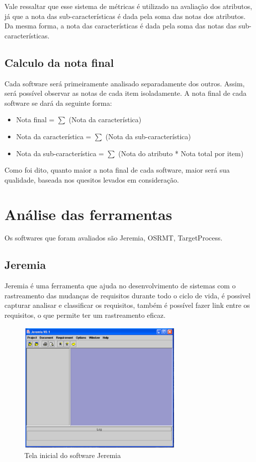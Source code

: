   Vale ressaltar que esse sistema de métricas é utilizado na avaliação dos atributos, já que a nota das sub-características é dada pela
  soma das notas dos atributos. Da mesma forma, a nota das características é dada pela soma das notas das sub-características.

\subsection{Calculo da nota final}

  Cada software será primeiramente analisado separadamente dos outros. Assim, será possível observar as notas de cada item isoladamente.
  A nota final de cada software se dará da seguinte forma:

  \begin{itemize}
    \item Nota final = $\displaystyle\sum$ (Nota da característica)
    \item Nota da característica = $\displaystyle\sum$ (Nota da sub-característica)
    \item Nota da sub-característica = $\displaystyle\sum$ (Nota do atributo * Nota total por item)
  \end{itemize}

  Como foi dito, quanto maior a nota final de cada software, maior será sua qualidade, baseada nos quesitos levados em consideração.

\section{Análise das ferramentas}

  Os softwares que foram avaliados são Jeremia, OSRMT, TargetProcess.

\subsection{Jeremia}

  Jeremia é uma ferramenta que ajuda no desenvolvimento de sistemas com o rastreamento das mudanças de requisitos durante todo o ciclo
  de vida, é possivel capturar analisar e classificar os requisitos, também é possível fazer link entre os requisitos, o que permite ter
  um rastreamento eficaz.

  \begin{figure}[!h]
    \centering
    \includegraphics[width=8cm, keepaspectratio=true]{figuras/ferramentas/jeremia1.eps}
    \caption{Tela inicial do software Jeremia}
  \end{figure}

